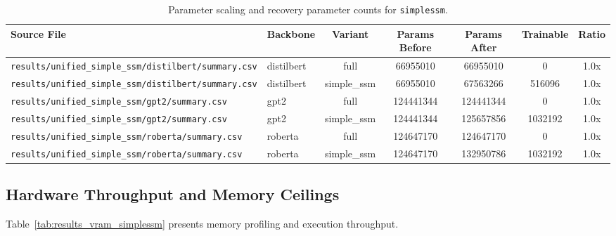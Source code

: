 \begin{table}[t]
\centering
\small
\begin{tabular}{llccccc}
\toprule
\textbf{Source File} & \textbf{Backbone} & \textbf{Variant} & \textbf{Params Before} & \textbf{Params After} & \textbf{Trainable} & \textbf{Ratio} \\
\midrule
\texttt{results/unified\_simple\_ssm/distilbert/summary.csv} & distilbert & full & 66955010 & 66955010 & 0 & 1.0x \\
\texttt{results/unified\_simple\_ssm/distilbert/summary.csv} & distilbert & simple\_ssm & 66955010 & 67563266 & 516096 & 1.0x \\
\texttt{results/unified\_simple\_ssm/gpt2/summary.csv} & gpt2 & full & 124441344 & 124441344 & 0 & 1.0x \\
\texttt{results/unified\_simple\_ssm/gpt2/summary.csv} & gpt2 & simple\_ssm & 124441344 & 125657856 & 1032192 & 1.0x \\
\texttt{results/unified\_simple\_ssm/roberta/summary.csv} & roberta & full & 124647170 & 124647170 & 0 & 1.0x \\
\texttt{results/unified\_simple\_ssm/roberta/summary.csv} & roberta & simple\_ssm & 124647170 & 132950786 & 1032192 & 1.0x \\
\bottomrule
\end{tabular}
\caption{Parameter scaling and recovery parameter counts for \texttt{simplessm}.}
\label{tab:results_params_simplessm}
\end{table}

\subsection{Hardware Throughput and Memory Ceilings}
Table~\ref{tab:results_vram_simplessm} presents memory profiling and execution throughput.

